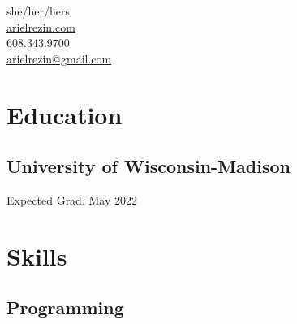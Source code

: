 \documentclass[]{hieudo-build}
\begin{document}
%
%
{
	\faTransgender \hspace{3 pt} {she/her/hers}\\
	\faGlobe \hspace{3 pt} \href{https://arielrezin.com}{arielrezin.com}\\
	\faPhone \hspace{3 pt} {608.343.9700}\\
	\faEnvelope \hspace{3 pt} \href{mailto:arielrezin@gmail.com}{arielrezin@gmail.com}\\
}
    
%
%
\begin{minipage}[t]{0.34\textwidth} 

\section{Education} 

\subsection{University of Wisconsin-Madison}
Expected Grad. May 2022 \\
\sectionsep


\section{Skills}

\subsection{Programming}
\smallsectionsep


\end{minipage}
\end{document}
